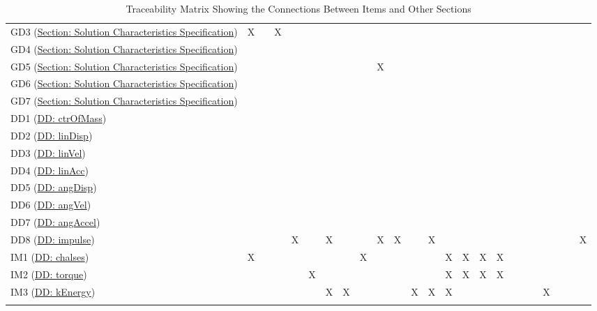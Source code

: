 \documentclass[12pt]{article}
\begin{document}
\begin{longtable}{l l l l l l l l l l l l l l l l l l l l l l l l}
\\
GD3 (\hyperref[Sec:SolCharSpec]{Section: Solution Characteristics Specification}) & X &  & X &  &  &  &  &  &  &  &  &  &  &  &  &  &  &  &  &  &  &  & 
\\
GD4 (\hyperref[Sec:SolCharSpec]{Section: Solution Characteristics Specification}) &  &  &  &  &  &  &  &  &  &  &  &  &  &  &  &  &  &  &  &  &  &  & 
\\
GD5 (\hyperref[Sec:SolCharSpec]{Section: Solution Characteristics Specification}) &  &  &  &  &  &  &  &  & X &  &  &  &  &  &  &  &  &  &  &  &  &  & 
\\
GD6 (\hyperref[Sec:SolCharSpec]{Section: Solution Characteristics Specification}) &  &  &  &  &  &  &  &  &  &  &  &  &  &  &  &  &  &  &  &  &  &  & 
\\
GD7 (\hyperref[Sec:SolCharSpec]{Section: Solution Characteristics Specification}) &  &  &  &  &  &  &  &  &  &  &  &  &  &  &  &  &  &  &  &  &  &  & 
\\
DD1 (\hyperref[DD:ctrOfMass]{DD: ctrOfMass}) &  &  &  &  &  &  &  &  &  &  &  &  &  &  &  &  &  &  &  &  &  &  & 
\\
DD2 (\hyperref[DD:linDisp]{DD: linDisp}) &  &  &  &  &  &  &  &  &  &  &  &  &  &  &  &  &  &  &  &  &  &  & 
\\
DD3 (\hyperref[DD:linVel]{DD: linVel}) &  &  &  &  &  &  &  &  &  &  &  &  &  &  &  &  &  &  &  &  &  &  & 
\\
DD4 (\hyperref[DD:linAcc]{DD: linAcc}) &  &  &  &  &  &  &  &  &  &  &  &  &  &  &  &  &  &  &  &  &  &  & 
\\
DD5 (\hyperref[DD:angDisp]{DD: angDisp}) &  &  &  &  &  &  &  &  &  &  &  &  &  &  &  &  &  &  &  &  &  &  & 
\\
DD6 (\hyperref[DD:angVel]{DD: angVel}) &  &  &  &  &  &  &  &  &  &  &  &  &  &  &  &  &  &  &  &  &  &  & 
\\
DD7 (\hyperref[DD:angAccel]{DD: angAccel}) &  &  &  &  &  &  &  &  &  &  &  &  &  &  &  &  &  &  &  &  &  &  & 
\\
DD8 (\hyperref[DD:impulse]{DD: impulse}) &  &  &  & X &  & X &  &  & X & X &  & X &  &  &  &  &  &  &  &  &  &  & X
\\
IM1 (\hyperref[DD:chalses]{DD: chalses}) & X &  &  &  &  &  &  & X &  &  &  &  & X & X & X & X &  &  &  &  &  &  & 
\\
IM2 (\hyperref[DD:torque]{DD: torque}) &  &  &  &  & X &  &  &  &  &  &  &  & X & X & X & X &  &  &  &  &  &  & 
\\
IM3 (\hyperref[DD:kEnergy]{DD: kEnergy}) &  &  &  &  &  & X & X &  &  &  & X & X & X &  &  &  &  &  &  & X &  &  & 
\\
\bottomrule
\caption{Traceability Matrix Showing the Connections Between Items and Other Sections}
\label{Table:TraceyItemsSecs}
\end{longtable}
\end{document}
